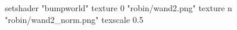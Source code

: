 setshader "bumpworld"
   texture 0 "robin/wand2.png"
   texture n "robin/wand2_norm.png"
texscale 0.5